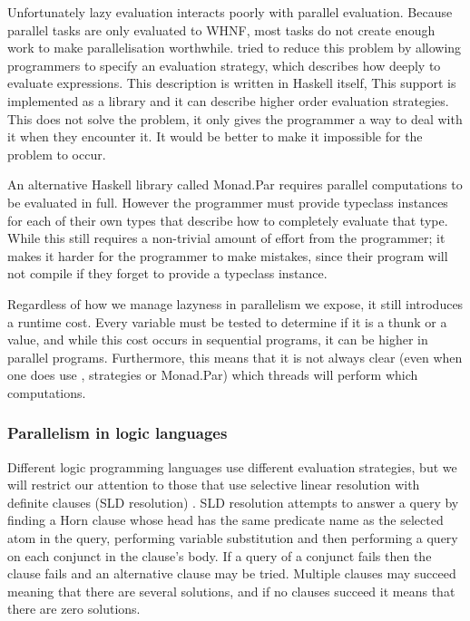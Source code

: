 Unfortunately lazy evaluation interacts poorly with
parallel evaluation.
Because parallel tasks are only evaluated to WHNF,
most tasks do not create enough work to make parallelisation worthwhile.
\citet{trinder:98:strategies}
tried to reduce this problem by allowing programmers to
specify an evaluation strategy,
which describes how deeply to evaluate expressions.
This description is written in Haskell itself,
This support is implemented as a library and it can describe higher order
evaluation strategies.
This does not solve the problem,
it only gives the programmer a way to deal with it when they encounter it.
It would be better to make it impossible for the problem to occur.

An alternative Haskell library called Monad.Par \citep{marlow:monadpar}
requires parallel computations to be evaluated in full.
However the programmer must provide typeclass instances for each of their
own types that describe how to completely evaluate that type.
While this still requires a non-trivial amount of effort from the
programmer;
it makes it harder for the programmer to make mistakes,
since their program will not compile if they forget to provide a typeclass
instance.

Regardless of how we manage lazyness in parallelism we expose,
it still introduces a runtime cost.
Every variable must be tested to determine if it is a thunk or a value,
and while this cost occurs in sequential programs, it can be higher in
parallel programs.
Furthermore, this means that it is not always clear
(even when one does use , strategies or Monad.Par)
which threads will perform which computations.

\subsubsection{Parallelism in logic languages}
\label{sec:intro_par_logic}

Different logic programming languages use different evaluation strategies,
but we will restrict our attention to those that use
selective linear resolution with definite
clauses (SLD resolution) \citep{kowalski_sld}.
SLD resolution attempts to answer a query by finding a Horn clause whose
head has the same predicate name as the selected atom in the query,
performing variable substitution and then performing a query on each
conjunct in the clause's body.
If a query of a conjunct fails then the clause fails and an alternative
clause may be tried.
Multiple clauses may succeed meaning that there are several solutions,
and if no clauses succeed it means that there are zero solutions.

